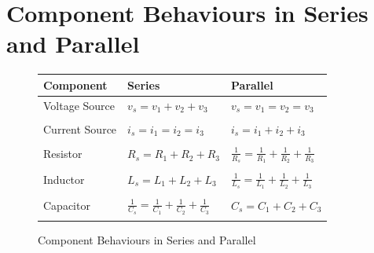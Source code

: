 \documentclass[oneside]{book}
\begin{document}
            \section{Component Behaviours in Series and Parallel}
                \begin{figure}[H]
                    \centering
                    \begin{tabular}{p{} p{} p{}}
                        \hline
                        \textbf{Component} & \textbf{Series} & \textbf{Parallel} \\
                        \hline
                        Voltage Source & $v_s = v_1 + v_2 + v_3$ & $v_s = v_1 = v_2 = v_3$\\
                        \hspace{0.2cm}\\
                        Current Source & $i_s = i_1 = i_2 = i_3$ & $i_s = i_1 + i_2 + i_3$\\
                        \hspace{0.2cm}\\
                        Resistor & $R_s = R_1 + R_2 + R_3$ & $\frac{1}{R_s} = \frac{1}{R_1} + \frac{1}{R_2} + \frac{1}{R_3}$\\
                        \hspace{0.2cm}\\
                        Inductor & $L_s = L_1 + L_2 + L_3$ & $\frac{1}{L_s} = \frac{1}{L_1} + \frac{1}{L_2} + \frac{1}{L_3}$\\
                        \hspace{0.2cm}\\
                        Capacitor & $\frac{1}{C_s} = \frac{1}{C_1} + \frac{1}{C_2} + \frac{1}{C_3}$ & $C_s = C_1 + C_2 + C_3$\\
                        \hspace{0.2cm}\\
                        \hline
                    \end{tabular}
                    \caption{Component Behaviours in Series and Parallel}
                \end{figure}
\end{document}
